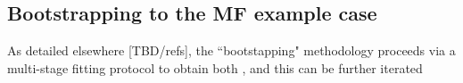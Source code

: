 \subsection{Bootstrapping to the MF example case}

As detailed elsewhere [TBD/refs], the ``bootstapping" methodology proceeds via a multi-stage fitting protocol to obtain both , and this can be further iterated